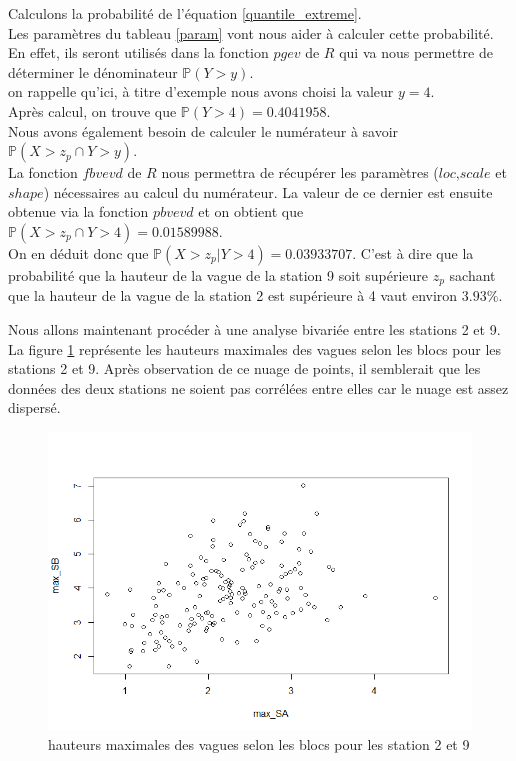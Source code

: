 \documentclass[a4paper,french,10pt]{article}
\begin{document}
Calculons la probabilité de l'équation \ref{quantile_extreme}. \\
Les paramètres du tableau \ref{param} vont nous aider à calculer cette probabilité. En effet, ils seront utilisés dans la fonction $pgev$ de $R$ qui va nous permettre de déterminer le dénominateur $\mathbb{P}(Y > y)$.\\
on rappelle qu'ici, à titre d'exemple nous avons choisi la valeur $y = 4$. \\
Après calcul, on trouve que $\mathbb{P}(Y > 4)=0.4041958$. \\
Nous avons également besoin de calculer le numérateur à savoir $\mathbb{P}(X > z_p \cap Y > y)$. \\
La fonction $fbvevd$ de $R$ nous permettra de récupérer les paramètres ($loc$,$scale$ et $shape$) nécessaires au calcul du numérateur. La valeur de ce dernier est ensuite obtenue via la fonction $pbvevd$ et on obtient que $\mathbb{P}(X > z_p \cap Y > 4) = 0.01589988$.\\
On en déduit donc que $\mathbb{P}(X > z_p | Y > 4) = 0.03933707$. C'est à dire que la probabilité que la hauteur de la vague de la station 9 soit supérieure $z_p$ sachant que la hauteur de la vague de la station 2 est supérieure à 4 vaut environ $3.93\%$.

\vspace{4mm}

Nous allons maintenant procéder à une analyse bivariée entre les stations 2 et 9. La figure \ref{double_max} représente les hauteurs maximales des vagues selon les blocs pour les stations 2 et 9. Après observation de ce nuage de points, il semblerait que les données des deux stations ne soient pas corrélées entre elles car le nuage est assez dispersé. 

\begin{figure}[htp] 
	\centering
	\includegraphics[scale=0.45]{images/double_max.png}
	\caption{hauteurs maximales des vagues selon les blocs pour les station 2 et 9}
	\label{double_max}
\end{figure}
\end{document}
